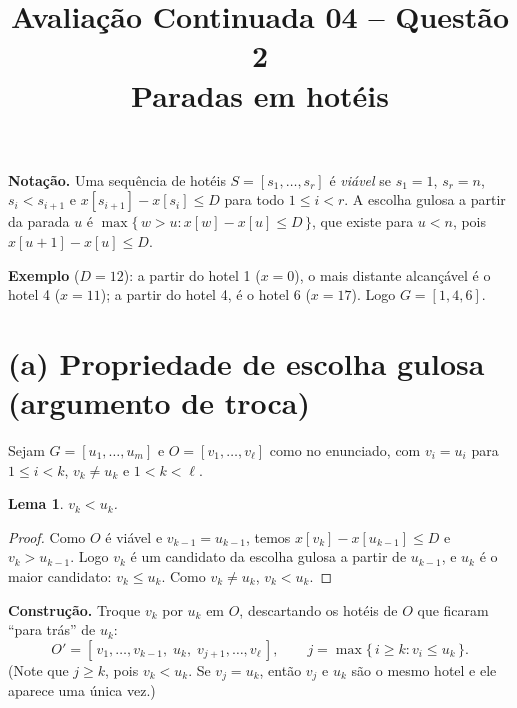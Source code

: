 \documentclass[11pt,a4paper]{article}
\title{Avaliação Continuada 04 -- Questão 2\\ \large Paradas em hotéis}
\date{}
\newtheorem{lema}{Lema}
\begin{document}
\maketitle

\noindent\textbf{Notação.} Uma sequência de hotéis $S=[s_1,\dots,s_r]$ é
\emph{viável} se $s_1 = 1$, $s_r = n$, $s_i < s_{i+1}$ e
$x[s_{i+1}] - x[s_i] \le D$ para todo $1 \le i < r$. A escolha gulosa a partir
da parada $u$ é $\max\{\, w > u : x[w] - x[u] \le D \,\}$, que existe para
$u<n$, pois $x[u+1]-x[u]\le D$.

\noindent\textbf{Exemplo} ($D=12$): a partir do hotel 1 ($x=0$), o mais distante
alcançável é o hotel 4 ($x=11$); a partir do hotel 4, é o hotel 6 ($x=17$).
Logo $G=[1,4,6]$.

\section*{(a) Propriedade de escolha gulosa (argumento de troca)}

Sejam $G=[u_1,\dots,u_m]$ e $O=[v_1,\dots,v_\ell]$ como no enunciado, com
$v_i = u_i$ para $1\le i<k$, $v_k \ne u_k$ e $1<k<\ell$.

\begin{lema}
$v_k < u_k$.
\end{lema}
\begin{proof}
Como $O$ é viável e $v_{k-1}=u_{k-1}$, temos $x[v_k] - x[u_{k-1}] \le D$ e
$v_k > u_{k-1}$. Logo $v_k$ é um candidato da escolha gulosa a partir de $u_{k-1}$,
e $u_k$ é o maior candidato: $v_k \le u_k$. Como $v_k \ne u_k$, $v_k < u_k$.
\end{proof}

\noindent\textbf{Construção.} Troque $v_k$ por $u_k$ em $O$, descartando os
hotéis de $O$ que ficaram ``para trás'' de $u_k$:
\[
O' = [\,v_1,\dots,v_{k-1},\; u_k,\; v_{j+1},\dots,v_\ell\,],
\qquad j = \max\{\, i \ge k : v_i \le u_k \,\}.
\]
(Note que $j\ge k$, pois $v_k<u_k$. Se $v_j = u_k$, então $v_j$ e $u_k$ são o mesmo
hotel e ele aparece uma única vez.)
\end{document}
